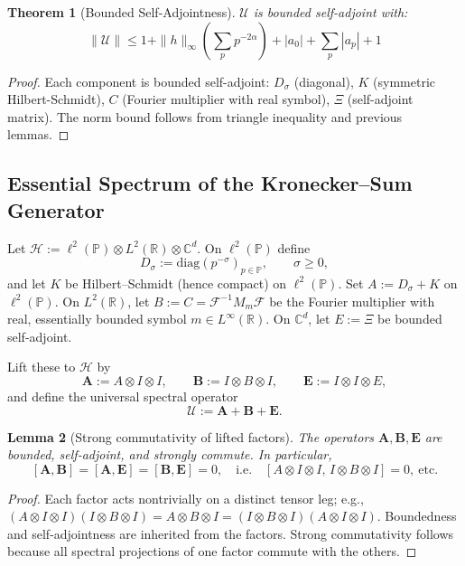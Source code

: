 \documentclass[10pt]{article}
\newtheorem{theorem}{Theorem}
\newtheorem{lemma}[theorem]{Lemma}
\newcommand{\UU}{\mathcal{U}}
\begin{document}
\begin{theorem}[Bounded Self-Adjointness]
$\UU$ is bounded self-adjoint with:
\[
\|\UU\| \leq 1 + \|h\|_\infty\left(\sum_p p^{-2\alpha}\right) + |a_0| + \sum_p |a_p| + 1
\]
\end{theorem}

\begin{proof}
Each component is bounded self-adjoint: $D_\sigma$ (diagonal), $K$ (symmetric Hilbert-Schmidt), $C$ (Fourier multiplier with real symbol), $\Xi$ (self-adjoint matrix). The norm bound follows from triangle inequality and previous lemmas.
\end{proof}

\subsection{Essential Spectrum of the Kronecker–Sum Generator}\label{sec:essential-spectrum}

Let \(\mathcal H := \ell^2(\mathbb P)\otimes L^2(\mathbb R)\otimes \mathbb C^d\).
On \(\ell^2(\mathbb P)\) define
\[
D_\sigma := \mathrm{diag}(p^{-\sigma})_{p\in\mathbb P},\qquad \sigma\ge 0,
\]
and let \(K\) be Hilbert–Schmidt (hence compact) on \(\ell^2(\mathbb P)\).
Set \(A := D_\sigma + K\) on \(\ell^2(\mathbb P)\).
On \(L^2(\mathbb R)\), let \(B:=C=\mathcal F^{-1}M_m\mathcal F\) be the Fourier multiplier with real, essentially bounded symbol \(m\in L^\infty(\mathbb R)\).
On \(\mathbb C^d\), let \(E:=\Xi\) be bounded self-adjoint.

Lift these to \(\mathcal H\) by
\[
\mathbf A := A\otimes I\otimes I,\qquad
\mathbf B := I\otimes B\otimes I,\qquad
\mathbf E := I\otimes I\otimes E,
\]
and define the universal spectral operator
\[
\mathcal U := \mathbf A + \mathbf B + \mathbf E .
\]

\begin{lemma}[Strong commutativity of lifted factors]\label{lem:strong-comm}
The operators \(\mathbf A,\mathbf B,\mathbf E\) are bounded, self-adjoint, and strongly commute. In particular,
\[
[\mathbf A,\mathbf B]=[\mathbf A,\mathbf E]=[\mathbf B,\mathbf E]=0,
\quad\text{i.e.}\quad
[A\otimes I\otimes I,\, I\otimes B\otimes I]=0,\ \text{etc.}
\]
\end{lemma}

\begin{proof}
Each factor acts nontrivially on a distinct tensor leg; e.g.,
\((A\otimes I\otimes I)(I\otimes B\otimes I)=A\otimes B\otimes I
=(I\otimes B\otimes I)(A\otimes I\otimes I)\).
Boundedness and self-adjointness are inherited from the factors.
Strong commutativity follows because all spectral projections of one factor commute with the others.
\end{proof}
\end{document}
